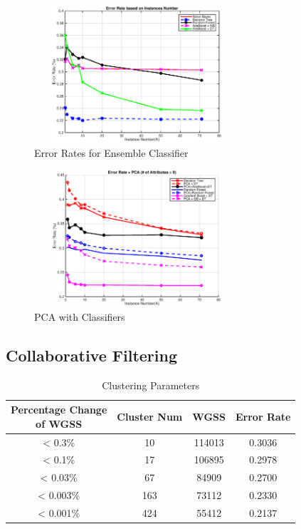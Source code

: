 \documentclass{sig-alternate-05-2015}
\begin{document}
\begin{figure}
\centering
\includegraphics[height=2in, width=3in]{Ensemble_Classifiers}
\caption{Error Rates for Ensemble Classifier}
\label{fig:ensemble classifier}
\end{figure}

\begin{figure}
\centering
\includegraphics[height=2in,width=3in]{PCA_Classifiers}
\caption{PCA with Classifiers}
\label{fig:pca}
\end{figure}

\subsection{Collaborative Filtering}

\begin{table}[!htb]
\centering
\caption{Clustering Parameters}
\label{table:clustering}
\begin{tabular}{|c|c|c|c|} \hline
\shortstack[l]{Percentage Change \\ of WGSS} & Cluster Num & WGSS & Error Rate \\ \hline
< 0.3\% & 10 & 114013 & 0.3036 \\ \hline
< 0.1\% & 17 & 106895 & 0.2978 \\ \hline
< 0.03\% & 67 & 84909 & 0.2700 \\ \hline
< 0.003\% & 163 & 73112 & 0.2330 \\ \hline
< 0.001\% & 424 & 55412 & 0.2137 \\
\hline\end{tabular}
\end{table}
\end{document}
